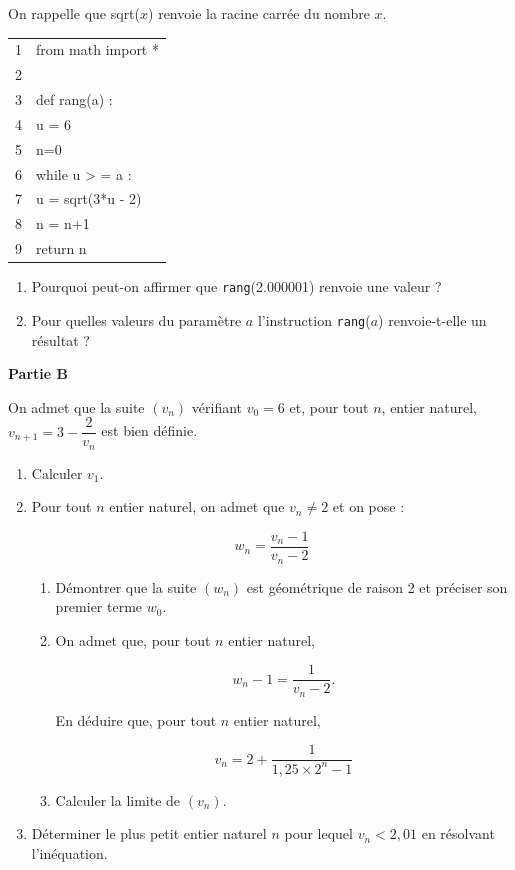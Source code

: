 \begin{enumerate}
On rappelle que sqrt($x$) renvoie la racine carrée du nombre $x$.

\begin{center}
\begin{ttfamily}
\begin{tabular}{>{\cellcolor{lightgray!50}}c l}
1&from math import *\\
2&\\
3&def rang(a) :\\
4&\quad  u = 6\\
5&\quad n=0\\
6& \quad while u > = a :\\
7&\qquad u = sqrt(3*u - 2)\\
8&\qquad n = n+1\\
9& \quad return n\\
\end{tabular}
\end{ttfamily}
\end{center}

	\begin{enumerate}
		\item Pourquoi peut-on affirmer que \texttt{rang}(2.000001) renvoie une valeur ?
		\item Pour quelles valeurs du paramètre $a$ l'instruction \texttt{rang}($a$) renvoie-t-elle un résultat ?
	\end{enumerate}
\end{enumerate}

\bigskip

\textbf{Partie B}

\medskip

On admet que la suite $\left(v_n\right)$ vérifiant $v_0 = 6$ et, pour tout $n$, entier naturel, $v_{n+1} = 3 - \dfrac{2}{v_n}$ est bien définie.

\medskip

\begin{enumerate}
\item Calculer $v_1$.
\item Pour tout $n$ entier naturel, on admet que $v_n \ne 2$ et on pose :

\[w_n = \dfrac{v_n - 1}{v_n - 2}\]

	\begin{enumerate}
		\item Démontrer que la suite $\left(w_n\right)$ est géométrique de raison 2 et préciser son premier terme $w_0$.
		\item On admet que, pour tout $n$ entier naturel,

\[w_n - 1 = \dfrac{1}{v_n - 2}.\]

En déduire que, pour tout $n$ entier naturel,

\[v_n = 2 + \dfrac{1}{1,25 \times 2^n - 1}\]

		\item Calculer la limite de $\left(v_n\right)$.
	\end{enumerate}
\item Déterminer le plus petit entier naturel $n$ pour lequel $v_n < 2,01$ en résolvant
l'inéquation.
\end{enumerate}

